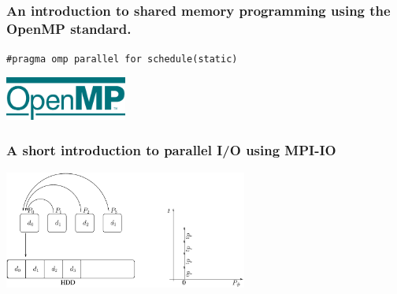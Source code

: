 \documentclass{beamer}
\begin{document}
\begin{frame}\frametitle{An introduction to shared memory programming
                         using the OpenMP standard.}
\begin{center}
\texttt{\#pragma omp parallel for schedule(static)}
\end{center}
\begin{center}
\includegraphics[width=4cm]{openmp}
\end{center}
\end{frame}

\begin{frame}\frametitle{A short introduction to parallel I/O using MPI-IO}
  \begin{center}
    \includegraphics[width=8cm]{serial}
  \end{center}
\end{frame}
\end{document}
